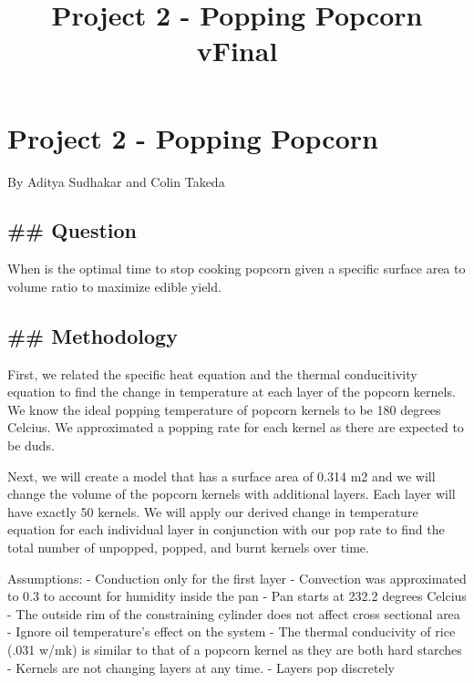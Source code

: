 \documentclass[11pt]{article}
\title{Project 2 - Popping Popcorn vFinal}
\begin{document}
    
    
    \maketitle
    
    

    
    \hypertarget{project-2---popping-popcorn}{%
\section{Project 2 - Popping
Popcorn}\label{project-2---popping-popcorn}}

    By Aditya Sudhakar and Colin Takeda

    \hypertarget{question}{%
\subsection{\#\# Question}\label{question}}

    When is the optimal time to stop cooking popcorn given a specific
surface area to volume ratio to maximize edible yield.

    \hypertarget{methodology}{%
\subsection{\#\# Methodology}\label{methodology}}

    First, we related the specific heat equation and the thermal
conducitivity equation to find the change in temperature at each layer
of the popcorn kernels. We know the ideal popping temperature of popcorn
kernels to be 180 degrees Celcius. We approximated a popping rate for
each kernel as there are expected to be duds.

Next, we will create a model that has a surface area of 0.314 m2 and we
will change the volume of the popcorn kernels with additional layers.
Each layer will have exactly 50 kernels. We will apply our derived
change in temperature equation for each individual layer in conjunction
with our pop rate to find the total number of unpopped, popped, and
burnt kernels over time.

Assumptions: - Conduction only for the first layer - Convection was
approximated to 0.3 to account for humidity inside the pan - Pan starts
at 232.2 degrees Celcius - The outside rim of the constraining cylinder
does not affect cross sectional area - Ignore oil temperature's effect
on the system - The thermal conducivity of rice (.031 w/mk) is similar
to that of a popcorn kernel as they are both hard starches - Kernels are
not changing layers at any time. - Layers pop discretely
\end{document}
